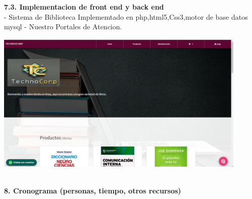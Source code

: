\begin{flushleft}
\begin{itemize}
\textbf{7.3.   Implementacion de front end y back end  }\\
-	 Sistema de Biblioteca Implememtado en php,html5,Css3,motor de base datos mysql
-          Nuestro  Portales de Atencion.

\begin{center}
	\includegraphics[width=12cm]{./Imagenes/web1} 
\end{center}








\textbf{ }\\
\textbf{8.      Cronograma (personas, tiempo, otros recursos) }\\
\textbf{ }\\


\end{itemize}
\end{flushleft}
